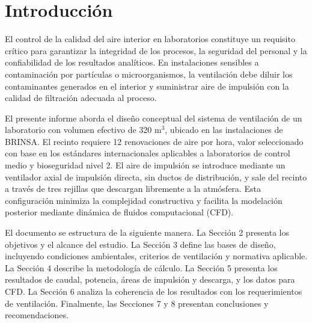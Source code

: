\section{Introducción}

El control de la calidad del aire interior en laboratorios constituye un requisito crítico para garantizar la integridad de los procesos, la seguridad del personal y la confiabilidad de los resultados analíticos. En instalaciones sensibles a contaminación por partículas o microorganismos, la ventilación debe diluir los contaminantes generados en el interior y suministrar aire de impulsión con la calidad de filtración adecuada al proceso.

El presente informe aborda el diseño conceptual del sistema de ventilación de un laboratorio con volumen efectivo de 320 m$^3$, ubicado en las instalaciones de BRINSA. El recinto requiere 12 renovaciones de aire por hora, valor seleccionado con base en los estándares internacionales aplicables a laboratorios de control medio y bioseguridad nivel 2. El aire de impulsión se introduce mediante un ventilador axial de impulsión directa, sin ductos de distribución, y sale del recinto a través de tres rejillas que descargan libremente a la atmósfera. Esta configuración minimiza la complejidad constructiva y facilita la modelación posterior mediante dinámica de fluidos computacional (CFD).

El documento se estructura de la siguiente manera. La Sección 2 presenta los objetivos y el alcance del estudio. La Sección 3 define las bases de diseño, incluyendo condiciones ambientales, criterios de ventilación y normativa aplicable. La Sección 4 describe la metodología de cálculo. La Sección 5 presenta los resultados de caudal, potencia, áreas de impulsión y descarga, y los datos para CFD. La Sección 6 analiza la coherencia de los resultados con los requerimientos de ventilación. Finalmente, las Secciones 7 y 8 presentan conclusiones y recomendaciones.
